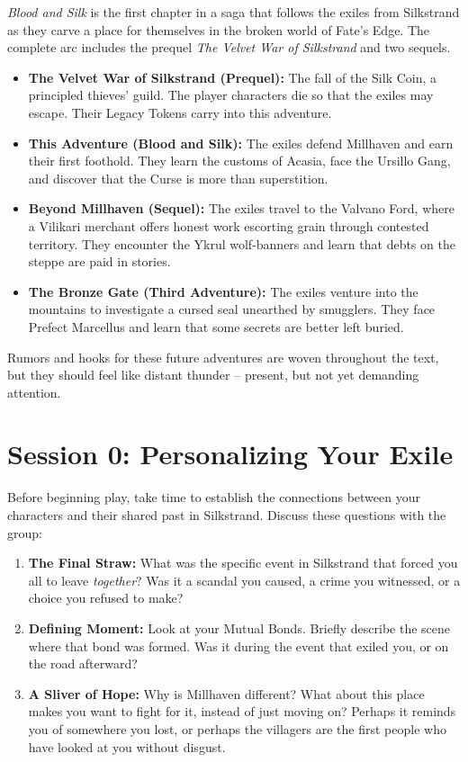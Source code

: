 \documentclass[11pt]{article}
\begin{document}
\textit{Blood and Silk} is the first chapter in a saga that follows the exiles from Silkstrand as they carve a place for themselves in the broken world of Fate's Edge. The complete arc includes the prequel \textit{The Velvet War of Silkstrand} and two sequels.

\begin{itemize}
\item \textbf{The Velvet War of Silkstrand (Prequel):} The fall of the Silk Coin, a principled thieves' guild. The player characters die so that the exiles may escape. Their Legacy Tokens carry into this adventure.
\item \textbf{This Adventure (Blood and Silk):} The exiles defend Millhaven and earn their first foothold. They learn the customs of Acasia, face the Ursillo Gang, and discover that the Curse is more than superstition.
\item \textbf{Beyond Millhaven (Sequel):} The exiles travel to the Valvano Ford, where a Vilikari merchant offers honest work escorting grain through contested territory. They encounter the Ykrul wolf-banners and learn that debts on the steppe are paid in stories.
\item \textbf{The Bronze Gate (Third Adventure):} The exiles venture into the mountains to investigate a cursed seal unearthed by smugglers. They face Prefect Marcellus and learn that some secrets are better left buried.
\end{itemize}

Rumors and hooks for these future adventures are woven throughout the text, but they should feel like distant thunder -- present, but not yet demanding attention.

\newpage

\tableofcontents

\newpage

\section{Session 0: Personalizing Your Exile}

Before beginning play, take time to establish the connections between your characters and their shared past in Silkstrand. Discuss these questions with the group:

\begin{enumerate}
\item \textbf{The Final Straw:} What was the specific event in Silkstrand that forced you all to leave \textit{together}? Was it a scandal you caused, a crime you witnessed, or a choice you refused to make?
\item \textbf{Defining Moment:} Look at your Mutual Bonds. Briefly describe the scene where that bond was formed. Was it during the event that exiled you, or on the road afterward?
\item \textbf{A Sliver of Hope:} Why is Millhaven different? What about this place makes you want to fight for it, instead of just moving on? Perhaps it reminds you of somewhere you lost, or perhaps the villagers are the first people who have looked at you without disgust.
\end{enumerate}
\end{document}
